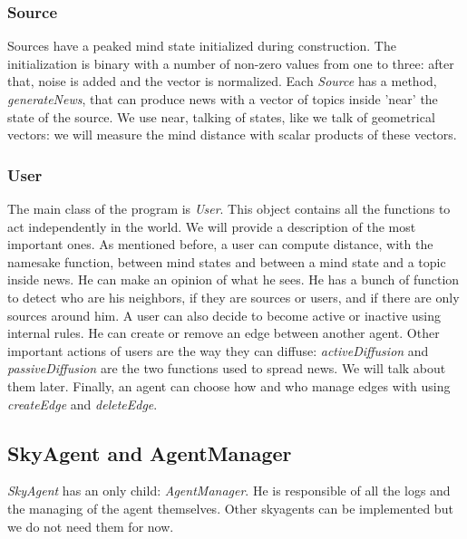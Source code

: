 \subsubsection{Source}
Sources have a peaked mind state initialized during construction.
The initialization is binary with a number of non-zero values from one to three:
after that, noise is added and the vector is normalized.
Each \textit{Source} has a method, \textit{generateNews}, that can produce
news with a vector of topics inside 'near' the state of the source.
We use near, talking of states, like we talk of geometrical vectors: we will
measure the mind distance with scalar products of these vectors.

\subsubsection{User}
The main class of the program is \textit{User}.
This object contains all the functions to act independently in the world.
We will provide a description of the most important ones.
As mentioned before, a user can compute distance, with the namesake
function, between mind states and between a mind state and a
topic inside news. He can make an opinion of what he sees.
He has a bunch of function to detect who are his neighbors, if they
are sources or users, and if there are only sources around him.
A user can also decide to become active or inactive using internal rules.
He can create or remove an edge between another agent.
Other important actions of users are the way they can diffuse:
\textit{activeDiffusion} and \textit{passiveDiffusion} are the
two functions used to spread news. We will talk about them later.
Finally, an agent can choose how and who manage edges with using
\textit{createEdge} and \textit{deleteEdge}.

\subsection{SkyAgent and AgentManager}
\textit{SkyAgent} has an only child: \textit{AgentManager}.
He is responsible of all the logs and the managing of the agent themselves.
Other skyagents can be implemented but we do not need them for now.

